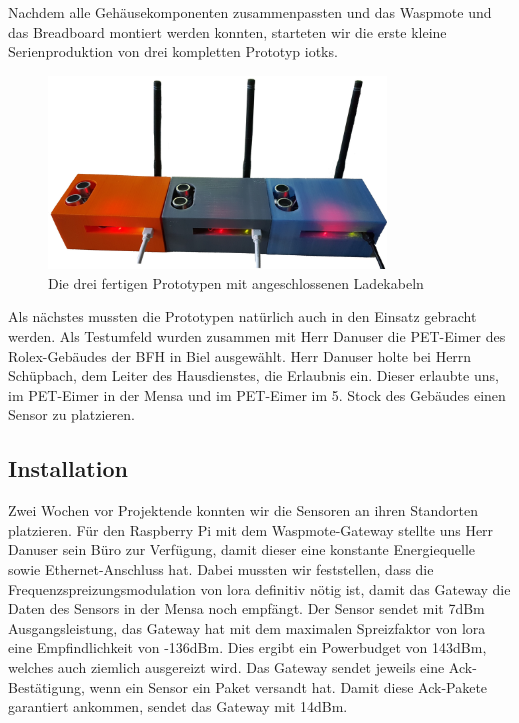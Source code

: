Nachdem alle Gehäusekomponenten zusammenpassten und das Waspmote und das Breadboard montiert werden konnten, starteten wir die erste kleine Serienproduktion von drei kompletten Prototyp \glspl{iotk}.

\begin{figure}[H]
     \centering
        \includegraphics[width=0.8\textwidth]{pictures/Massproduction.jpg}
    \caption{Die drei fertigen Prototypen mit angeschlossenen Ladekabeln}
    \label{fig:3-Prototypes}
\end{figure}

Als nächstes mussten die Prototypen natürlich auch in den Einsatz gebracht werden. Als Testumfeld wurden zusammen mit Herr Danuser die PET-Eimer des Rolex-Gebäudes der BFH in Biel ausgewählt. Herr Danuser holte bei Herrn Schüpbach, dem Leiter des Hausdienstes, die Erlaubnis ein. Dieser erlaubte uns, im PET-Eimer in der Mensa und im PET-Eimer im 5. Stock des Gebäudes einen Sensor zu platzieren.

\subsection*{Installation}
Zwei Wochen vor Projektende konnten wir die Sensoren an ihren Standorten platzieren. Für den Raspberry Pi mit dem Waspmote-Gateway stellte uns Herr Danuser sein Büro zur Verfügung, damit dieser eine konstante Energiequelle sowie Ethernet-Anschluss hat.
Dabei mussten wir feststellen, dass die Frequenzspreizungsmodulation von \gls{lora} definitiv nötig ist, damit das Gateway die Daten des Sensors in der Mensa noch empfängt. Der Sensor sendet mit 7dBm Ausgangsleistung, das Gateway hat mit dem maximalen Spreizfaktor von \gls{lora} eine Empfindlichkeit von -136dBm. Dies ergibt ein Powerbudget von 143dBm, welches auch ziemlich ausgereizt wird. Das Gateway sendet jeweils eine Ack-Bestätigung, wenn ein Sensor ein Paket versandt hat. Damit diese Ack-Pakete garantiert ankommen, sendet das Gateway mit 14dBm.

